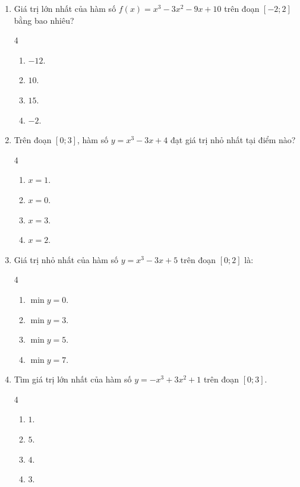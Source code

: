 \documentclass[12pt]{article}
\begin{document}
\begin{enumerate}[label=\textbf{Câu \arabic*.}]
		
		\item Giá trị lớn nhất của hàm số $f(x) = x^3 - 3x^2 - 9x + 10$ trên đoạn $[-2; 2]$ bằng bao nhiêu?
		\begin{multicols}{4}
			\begin{enumerate}[label=\textbf{\Alph*.}]
				\item $-12$.
				\item $10$.
				\item $15$.
				\item $-2$.
			\end{enumerate}
		\end{multicols}
		
		\item Trên đoạn $[0; 3]$, hàm số $y = x^3 - 3x + 4$ đạt giá trị nhỏ nhất tại điểm nào?
		\begin{multicols}{4}
			\begin{enumerate}[label=\textbf{\Alph*.}]
				\item $x = 1$.
				\item $x = 0$.
				\item $x = 3$.
				\item $x = 2$.
			\end{enumerate}
		\end{multicols}
		
		\item Giá trị nhỏ nhất của hàm số $y = x^3 - 3x + 5$ trên đoạn $[0; 2]$ là:
		\begin{multicols}{4}
			\begin{enumerate}[label=\textbf{\Alph*.}]
				\item $\min y = 0$.
				\item $\min y = 3$.
				\item $\min y = 5$.
				\item $\min y = 7$.
			\end{enumerate}
		\end{multicols}
		
		\item Tìm giá trị lớn nhất của hàm số $y = -x^3 + 3x^2 + 1$ trên đoạn $[0; 3]$.
		\begin{multicols}{4}
			\begin{enumerate}[label=\textbf{\Alph*.}]
				\item $1$.
				\item $5$.
				\item $4$.
				\item $3$.
			\end{enumerate}
		\end{multicols}
		

\end{enumerate}
\end{document}
